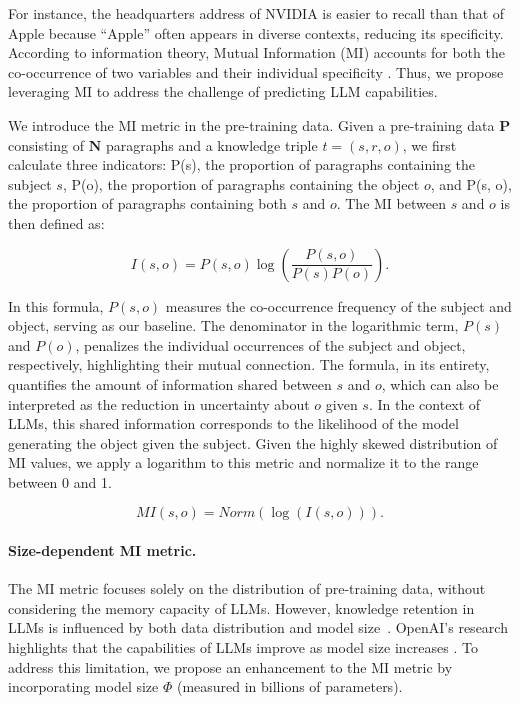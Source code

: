 For instance, the headquarters address of NVIDIA is easier to recall than that of Apple because ``Apple'' often appears in diverse contexts, reducing its specificity. According to information theory, Mutual Information (MI) accounts for both the co-occurrence of two variables and their individual specificity \cite{DBLP:journals/bstj/Shannon48}. Thus, we propose leveraging MI to address the challenge of predicting LLM capabilities.

We introduce the MI metric in the pre-training data. Given a pre-training data \(\mathbf{P}\) consisting of \(\mathbf{N}\) paragraphs and a knowledge triple $t = (s, r, o)$, we first calculate three indicators: P(s), the proportion of paragraphs containing the subject $s$, P(o), the proportion of paragraphs containing the object $o$, and P(s, o), the proportion of paragraphs containing both $s$ and $o$. The MI between $s$ and $o$ is then defined as:

\begin{equation}
    I(s, o) = P(s, o) \log \left( \frac{P(s, o)}{P(s)P(o)} \right).
\end{equation}

In this formula, $P(s, o)$ measures the co-occurrence frequency of the subject and object, serving as our baseline. The denominator in the logarithmic term, $P(s)$ and $P(o)$, penalizes the individual occurrences of the subject and object, respectively, highlighting their mutual connection. The formula, in its entirety, quantifies the amount of information shared between $s$ and $o$, which can also be interpreted as the reduction in uncertainty about $o$ given $s$. In the context of LLMs, this shared information corresponds to the likelihood of the model generating the object given the subject. Given the highly skewed distribution of MI values, we apply a logarithm to this metric and normalize it to the range between 0 and 1.

\begin{equation}
    MI(s, o) = Norm(\log(I(s, o))).
\end{equation}

\paragraph{Size-dependent MI metric.}
The MI metric focuses solely on the distribution of pre-training data, without considering the memory capacity of LLMs. However, knowledge retention in LLMs is influenced by both data distribution and model size~\cite{DBLP:journals/corr/abs-2403-00510}. OpenAI’s research highlights that the capabilities of LLMs improve as model size increases \cite{DBLP:journals/corr/abs-2001-08361}. To address this limitation, we propose an enhancement to the MI metric by incorporating model size \(\Phi\) (measured in billions of parameters).

